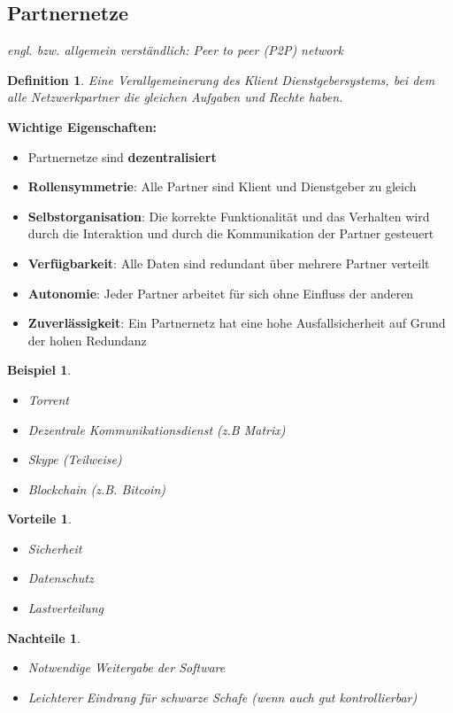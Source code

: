 \documentclass[a4paper]{article}
\theoremstyle{break}
\newtheorem{defi}{Definition}[section]
\newtheorem{ex}{Beispiel}[section]
\newtheorem{why}{Vorteile}[section]
\newtheorem{whynot}{Nachteile}[section]
\begin{document}
\subsection{Partnernetze}
\textit{engl. bzw. allgemein verständlich: Peer to peer (P2P) network}
\begin{defi}
	Eine Verallgemeinerung des Klient Dienstgebersystems, bei dem alle Netzwerkpartner die gleichen Aufgaben und Rechte haben.
\end{defi}
\textbf{Wichtige Eigenschaften:}
\begin{itemize}
	\item Partnernetze sind \textbf{dezentralisiert}
	\item \textbf{Rollensymmetrie}: Alle Partner sind Klient und Dienstgeber zu gleich
	\item \textbf{Selbstorganisation}: Die korrekte Funktionalität und das Verhalten wird durch die Interaktion und durch die Kommunikation der Partner gesteuert
	\item \textbf{Verfügbarkeit}: Alle Daten sind redundant über mehrere Partner verteilt
	\item \textbf{Autonomie}: Jeder Partner arbeitet für sich ohne Einfluss der anderen
	\item \textbf{Zuverlässigkeit}: Ein Partnernetz hat eine hohe Ausfallsicherheit auf Grund der hohen Redundanz
\end{itemize}
\begin{ex}
	\begin{itemize}
		\item Torrent
		\item Dezentrale Kommunikationsdienst (z.B Matrix)
		\item Skype (Teilweise)
		\item Blockchain (z.B. Bitcoin)
	\end{itemize}
\end{ex}
\begin{why}
	\begin{itemize}
		\item Sicherheit
		\item Datenschutz
		\item Lastverteilung
	\end{itemize}
\end{why}
\begin{whynot}
	\begin{itemize}
		\item Notwendige Weitergabe der Software
		\item Leichterer Eindrang für schwarze Schafe (wenn auch gut kontrollierbar)
	\end{itemize}
\end{whynot}
\end{document}
